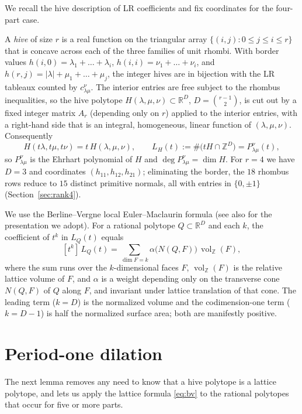 \documentclass[11pt]{amsart}
\theoremstyle{definition}
\DeclareMathOperator{\vol}{vol}
\newcommand{\Z}{\mathbb{Z}}
\newcommand{\R}{\mathbb{R}}
\newcommand{\lam}{\lambda}
\begin{document}
We recall the hive description of LR coefficients \cite{KnutsonTao} and fix
coordinates for the four-part case.

A \emph{hive} of size $r$ is a real function on the triangular array
$\{(i,j):0\le j\le i\le r\}$ that is concave across each of the three families
of unit rhombi. With border values
$h(i,0)=\lam_1+\dots+\lam_i$, $h(i,i)=\nu_1+\dots+\nu_i$, and
$h(r,j)=|\lam|+\mu_1+\dots+\mu_j$, the integer hives are in bijection with the
LR tableaux counted by $c^{\nu}_{\lam\mu}$. The interior entries are free
subject to the rhombus inequalities, so the hive polytope
$H(\lam,\mu,\nu)\subset\R^{D}$, $D=\binom{r-1}{2}$, is cut out by a fixed
integer matrix $A_r$ (depending only on $r$) applied to the interior entries,
with a right-hand side that is an integral, homogeneous, linear function of
$(\lam,\mu,\nu)$. Consequently
\[
  H(t\lam,t\mu,t\nu)=t\,H(\lam,\mu,\nu),\qquad
  L_H(t):=\#\bigl(tH\cap\Z^{D}\bigr)=P^{\nu}_{\lam\mu}(t),
\]
so $P^{\nu}_{\lam\mu}$ is the Ehrhart polynomial of $H$ and
$\deg P^{\nu}_{\lam\mu}=\dim H$. For $r=4$ we have $D=3$ and coordinates
$(h_{11},h_{12},h_{21})$; eliminating the border, the $18$ rhombus rows reduce
to $15$ distinct primitive normals, all with entries in $\{0,\pm1\}$
(Section~\ref{sec:rank4}).

We use the Berline--Vergne local Euler--Maclaurin formula
\cite{BerlineVergne} (see also \cite{RingSchurmann} for the presentation we
adopt). For a rational polytope $Q\subset\R^{D}$ and each $k$, the coefficient
of $t^{k}$ in $L_{Q}(t)$ equals
\begin{equation}\label{eq:bv}
  [t^{k}]\,L_{Q}(t)=\sum_{\dim F=k}\alpha\bigl(N(Q,F)\bigr)\,\vol_{\Z}(F),
\end{equation}
where the sum runs over the $k$-dimensional faces $F$, $\vol_{\Z}(F)$ is the
relative lattice volume of $F$, and $\alpha$ is a weight depending only on the
transverse cone $N(Q,F)$ of $Q$ along $F$, and invariant under lattice
translation of that cone. The leading term ($k=D$) is the normalized volume and
the codimension-one term ($k=D-1$) is half the normalized surface area; both are
manifestly positive.

\section{Period-one dilation}\label{sec:dilation}

The next lemma removes any need to know that a hive polytope is a lattice
polytope, and lets us apply the lattice formula \eqref{eq:bv} to the rational
polytopes that occur for five or more parts.
\end{document}

